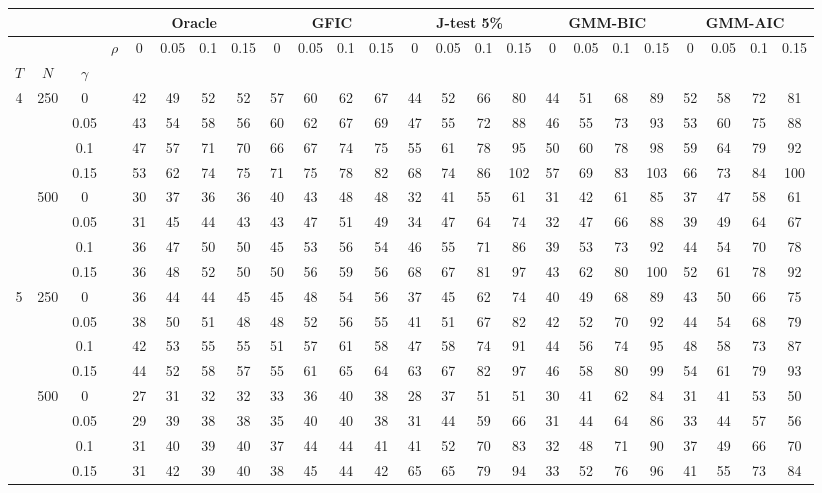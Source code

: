 \begin{tabular}{cccc|cccc|cccc|cccc|cccc|cccc} 
 \hline \hline 
\multicolumn{4}{c}{}&\multicolumn{4}{c}{Oracle}&\multicolumn{4}{c}{GFIC}&\multicolumn{4}{c}{J-test 5\%}&\multicolumn{4}{c}{GMM-BIC}&\multicolumn{4}{c}{GMM-AIC}\\ 
 \hline
 &  &  & $\rho$ & 0 & 0.05 & 0.1 & 0.15 & 0 & 0.05 & 0.1 & 0.15 & 0 & 0.05 & 0.1 & 0.15 & 0 & 0.05 & 0.1 & 0.15 & 0 & 0.05 & 0.1 & 0.15 \\
$T$ & $N$ & $\gamma$ &  &  &  &  &  &  &  &  &  &  &  &  &  &  &  &  &  &  &  &  &  \\
\hline
4 & 250 & 0 &  & 42 & 49 & 52 & 52 & 57 & 60 & 62 & 67 & 44 & 52 & 66 & 80 & 44 & 51 & 68 & 89 & 52 & 58 & 72 & 81 \\
 &  & 0.05 &  & 43 & 54 & 58 & 56 & 60 & 62 & 67 & 69 & 47 & 55 & 72 & 88 & 46 & 55 & 73 & 93 & 53 & 60 & 75 & 88 \\
 &  & 0.1 &  & 47 & 57 & 71 & 70 & 66 & 67 & 74 & 75 & 55 & 61 & 78 & 95 & 50 & 60 & 78 & 98 & 59 & 64 & 79 & 92 \\
 &  & 0.15 &  & 53 & 62 & 74 & 75 & 71 & 75 & 78 & 82 & 68 & 74 & 86 & 102 & 57 & 69 & 83 & 103 & 66 & 73 & 84 & 100 \\
 \hline
 & 500 & 0 &  & 30 & 37 & 36 & 36 & 40 & 43 & 48 & 48 & 32 & 41 & 55 & 61 & 31 & 42 & 61 & 85 & 37 & 47 & 58 & 61 \\
 &  & 0.05 &  & 31 & 45 & 44 & 43 & 43 & 47 & 51 & 49 & 34 & 47 & 64 & 74 & 32 & 47 & 66 & 88 & 39 & 49 & 64 & 67 \\
 &  & 0.1 &  & 36 & 47 & 50 & 50 & 45 & 53 & 56 & 54 & 46 & 55 & 71 & 86 & 39 & 53 & 73 & 92 & 44 & 54 & 70 & 78 \\
 &  & 0.15 &  & 36 & 48 & 52 & 50 & 50 & 56 & 59 & 56 & 68 & 67 & 81 & 97 & 43 & 62 & 80 & 100 & 52 & 61 & 78 & 92 \\
 \hline
5 & 250 & 0 &  & 36 & 44 & 44 & 45 & 45 & 48 & 54 & 56 & 37 & 45 & 62 & 74 & 40 & 49 & 68 & 89 & 43 & 50 & 66 & 75 \\
 &  & 0.05 &  & 38 & 50 & 51 & 48 & 48 & 52 & 56 & 55 & 41 & 51 & 67 & 82 & 42 & 52 & 70 & 92 & 44 & 54 & 68 & 79 \\
 &  & 0.1 &  & 42 & 53 & 55 & 55 & 51 & 57 & 61 & 58 & 47 & 58 & 74 & 91 & 44 & 56 & 74 & 95 & 48 & 58 & 73 & 87 \\
 &  & 0.15 &  & 44 & 52 & 58 & 57 & 55 & 61 & 65 & 64 & 63 & 67 & 82 & 97 & 46 & 58 & 80 & 99 & 54 & 61 & 79 & 93 \\
 \hline
 & 500 & 0 &  & 27 & 31 & 32 & 32 & 33 & 36 & 40 & 38 & 28 & 37 & 51 & 51 & 30 & 41 & 62 & 84 & 31 & 41 & 53 & 50 \\
 &  & 0.05 &  & 29 & 39 & 38 & 38 & 35 & 40 & 40 & 38 & 31 & 44 & 59 & 66 & 31 & 44 & 64 & 86 & 33 & 44 & 57 & 56 \\
 &  & 0.1 &  & 31 & 40 & 39 & 40 & 37 & 44 & 44 & 41 & 41 & 52 & 70 & 83 & 32 & 48 & 71 & 90 & 37 & 49 & 66 & 70 \\
 &  & 0.15 &  & 31 & 42 & 39 & 40 & 38 & 45 & 44 & 42 & 65 & 65 & 79 & 94 & 33 & 52 & 76 & 96 & 41 & 55 & 73 & 84 \\
\hline
\end{tabular}
